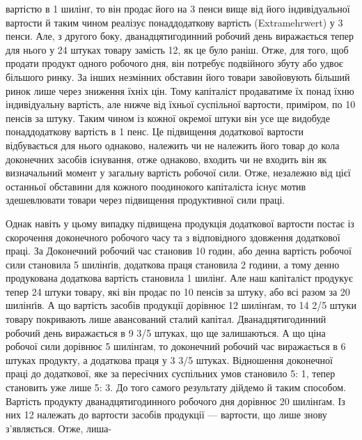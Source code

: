 \parcont{}  %
вартістю в 1 шилінґ, то він продає його на 3 пенси вище від його
індивідуальної вартости й таким чином реалізує понаддодаткову
вартість (Extramehrwert) у 3 пенси. Але, з другого боку, дванадцятигодинний
робочий день виражається тепер для нього у
24 штуках товару замість 12, як це було раніш. Отже, для
того, щоб продати продукт одного робочого дня, він потребує
подвійного збуту або удвоє більшого ринку. За інших незмінних
обставин його товари завойовують більший ринок лише через
зниження їхніх цін. Тому капіталіст продаватиме їх понад їхню
індивідуальну вартість, але нижче від їхньої суспільної вартости,
приміром, по 10 пенсів за штуку. Таким чином із кожної окремої
штуки він усе ще видобуде понаддодаткову вартість в 1 пенс. Це
підвищення додаткової вартости відбувається для нього однаково,
належить чи не належить його товар до кола доконечних
засобів існування, отже однаково, входить чи не входить він як
визначальний момент у загальну вартість робочої сили. Отже,
незалежно від цієї останньої обставини для кожного поодинокого
капіталіста існує мотив здешевлювати товари через підвищення
продуктивної сили праці.

Однак навіть у цьому випадку підвищена продукція додаткової
вартости постає із скорочення доконечного робочого часу та
з відповідного здовження додаткової праці. За  Доконечний робочий
час становив 10 годин, або денна вартість робочої сили становила
5 шилінґів, додаткова праця становила 2 години, а тому
денно продукована додаткова вартість становила 1 шилінґ. Але
наш капіталіст продукує тепер 24 штуки товару, які він продає
по 10 пенсів за штуку, або всі разом за 20 шилінґів. А що вартість
засобів продукції дорівнює 12 шилінґам, то 14 2/5 штуки товару
покривають лише авансований сталий капітал. Дванадцятигодинний
робочий день виражається в 9 3/5 штуках, що ще залишаються.
А що ціна робочої сили дорівнює 5 шилінґам, то доконечний робочий
час виражається в 6 штуках продукту, а додаткова праця
у 3 3/5 штуках. Відношення доконечної праці до додаткової, яке за
пересічних суспільних умов становило 5: 1, тепер становить
уже лише 5: 3. До того самого результату дійдемо й таким способом.
Вартість продукту дванадцятигодинного робочого дня
дорівнює 20 шилінґам. Із них 12 належать до вартости засобів
продукції — вартости, що лише знову з’являється. Отже, лиша-


